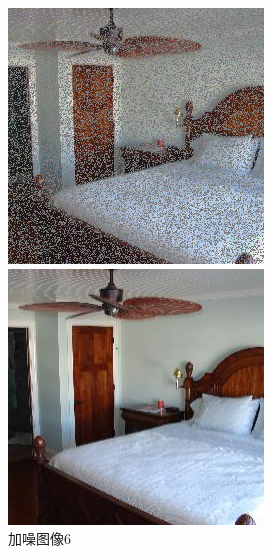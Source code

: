 \begin{figure}[H]
  \centering
  \begin{minipage}[b]{0.3\linewidth}
\includegraphics[width=\linewidth]{Picture/input/00008.png}
    \caption{加噪图像6}
    \label{noised image 6 }
  \end{minipage}
  \hspace{0.1cm} %
   \begin{minipage}[b]{0.3\linewidth}
    \includegraphics[width=\linewidth]{Picture/label/00008.png}

\end{minipage}
\end{figure}
